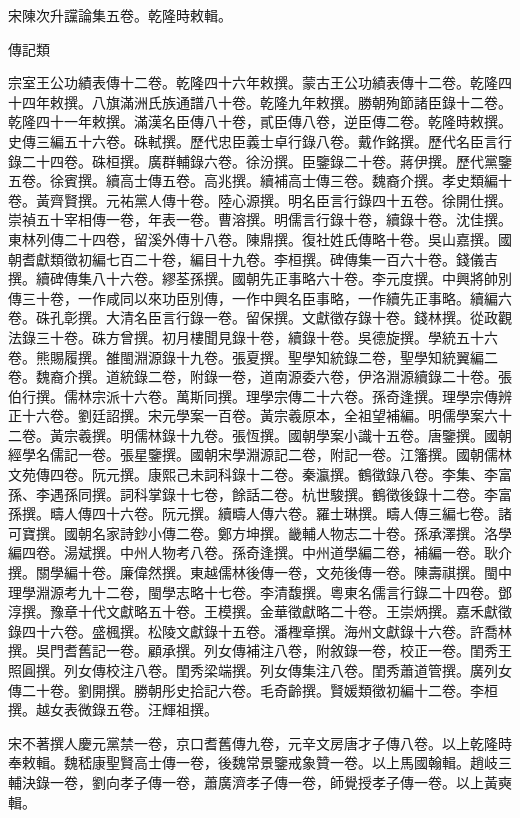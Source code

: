 \begin{pinyinscope}
宋陳次升讜論集五卷。乾隆時敕輯。

傳記類

宗室王公功績表傳十二卷。乾隆四十六年敕撰。蒙古王公功績表傳十二卷。乾隆四十四年敕撰。八旗滿洲氏族通譜八十卷。乾隆九年敕撰。勝朝殉節諸臣錄十二卷。乾隆四十一年敕撰。滿漢名臣傳八十卷，貳臣傳八卷，逆臣傳二卷。乾隆時敕撰。史傳三編五十六卷。硃軾撰。歷代忠臣義士卓行錄八卷。戴作銘撰。歷代名臣言行錄二十四卷。硃桓撰。廣群輔錄六卷。徐汾撰。臣鑒錄二十卷。蔣伊撰。歷代黨鑒五卷。徐賓撰。續高士傳五卷。高兆撰。續補高士傳三卷。魏裔介撰。孝史類編十卷。黃齊賢撰。元祐黨人傳十卷。陸心源撰。明名臣言行錄四十五卷。徐開仕撰。崇禎五十宰相傳一卷，年表一卷。曹溶撰。明儒言行錄十卷，續錄十卷。沈佳撰。東林列傳二十四卷，留溪外傳十八卷。陳鼎撰。復社姓氏傳略十卷。吳山嘉撰。國朝耆獻類徵初編七百二十卷，編目十九卷。李桓撰。碑傳集一百六十卷。錢儀吉撰。續碑傳集八十六卷。繆荃孫撰。國朝先正事略六十卷。李元度撰。中興將帥別傳三十卷，一作咸同以來功臣別傳，一作中興名臣事略，一作續先正事略。續編六卷。硃孔彰撰。大清名臣言行錄一卷。留保撰。文獻徵存錄十卷。錢林撰。從政觀法錄三十卷。硃方曾撰。初月樓聞見錄十卷，續錄十卷。吳德旋撰。學統五十六卷。熊賜履撰。雒閩淵源錄十九卷。張夏撰。聖學知統錄二卷，聖學知統翼編二卷。魏裔介撰。道統錄二卷，附錄一卷，道南源委六卷，伊洛淵源續錄二十卷。張伯行撰。儒林宗派十六卷。萬斯同撰。理學宗傳二十六卷。孫奇逢撰。理學宗傳辨正十六卷。劉廷詔撰。宋元學案一百卷。黃宗羲原本，全祖望補編。明儒學案六十二卷。黃宗羲撰。明儒林錄十九卷。張恆撰。國朝學案小識十五卷。唐鑒撰。國朝經學名儒記一卷。張星鑒撰。國朝宋學淵源記二卷，附記一卷。江籓撰。國朝儒林文苑傳四卷。阮元撰。康熙己未詞科錄十二卷。秦瀛撰。鶴徵錄八卷。李集、李富孫、李遇孫同撰。詞科掌錄十七卷，餘話二卷。杭世駿撰。鶴徵後錄十二卷。李富孫撰。疇人傳四十六卷。阮元撰。續疇人傳六卷。羅士琳撰。疇人傳三編七卷。諸可寶撰。國朝名家詩鈔小傳二卷。鄭方坤撰。畿輔人物志二十卷。孫承澤撰。洛學編四卷。湯斌撰。中州人物考八卷。孫奇逢撰。中州道學編二卷，補編一卷。耿介撰。關學編十卷。廉偉然撰。東越儒林後傳一卷，文苑後傳一卷。陳壽祺撰。閩中理學淵源考九十二卷，閩學志略十七卷。李清馥撰。粵東名儒言行錄二十四卷。鄧淳撰。豫章十代文獻略五十卷。王模撰。金華徵獻略二十卷。王崇炳撰。嘉禾獻徵錄四十六卷。盛楓撰。松陵文獻錄十五卷。潘檉章撰。海州文獻錄十六卷。許喬林撰。吳門耆舊記一卷。顧承撰。列女傳補注八卷，附敘錄一卷，校正一卷。閨秀王照圓撰。列女傳校注八卷。閨秀梁端撰。列女傳集注八卷。閨秀蕭道管撰。廣列女傳二十卷。劉開撰。勝朝彤史拾記六卷。毛奇齡撰。賢媛類徵初編十二卷。李桓撰。越女表微錄五卷。汪輝祖撰。

宋不著撰人慶元黨禁一卷，京口耆舊傳九卷，元辛文房唐才子傳八卷。以上乾隆時奉敕輯。魏嵇康聖賢高士傳一卷，後魏常景鑒戒象贊一卷。以上馬國翰輯。趙岐三輔決錄一卷，劉向孝子傳一卷，蕭廣濟孝子傳一卷，師覺授孝子傳一卷。以上黃奭輯。


\end{pinyinscope}
